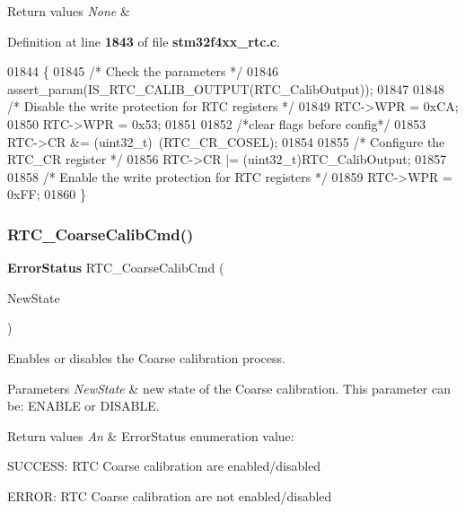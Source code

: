 \begin{DoxyRetVals}{Return values}
{\em None} & \\
\hline
\end{DoxyRetVals}


Definition at line \textbf{ 1843} of file \textbf{ stm32f4xx\+\_\+rtc.\+c}.


\begin{DoxyCode}
01844 \{
01845   \textcolor{comment}{/* Check the parameters */}
01846   assert_param(IS_RTC_CALIB_OUTPUT(RTC\_CalibOutput));
01847 
01848   \textcolor{comment}{/* Disable the write protection for RTC registers */}
01849   RTC->WPR = 0xCA;
01850   RTC->WPR = 0x53;
01851   
01852   \textcolor{comment}{/*clear flags before config*/}
01853   RTC->CR &= (uint32\_t)~(RTC_CR_COSEL);
01854 
01855   \textcolor{comment}{/* Configure the RTC\_CR register */}
01856   RTC->CR |= (uint32\_t)RTC\_CalibOutput;
01857 
01858   \textcolor{comment}{/* Enable the write protection for RTC registers */}
01859   RTC->WPR = 0xFF;
01860 \}
\end{DoxyCode}
\mbox{\label{group__RTC__Group7_ga008ae7173b2befe876f5e76686bc9089}} 
\subsubsection{R\+T\+C\+\_\+\+Coarse\+Calib\+Cmd()}
{\footnotesize\ttfamily \textbf{ Error\+Status} R\+T\+C\+\_\+\+Coarse\+Calib\+Cmd (\begin{DoxyParamCaption}\item[{\textbf{ Functional\+State}}]{New\+State }\end{DoxyParamCaption})}



Enables or disables the Coarse calibration process. 


\begin{DoxyParams}{Parameters}
{\em New\+State} & new state of the Coarse calibration. This parameter can be\+: E\+N\+A\+B\+LE or D\+I\+S\+A\+B\+LE. \\
\hline
\end{DoxyParams}

\begin{DoxyRetVals}{Return values}
{\em An} & Error\+Status enumeration value\+:
\begin{DoxyItemize}
\item S\+U\+C\+C\+E\+SS\+: R\+TC Coarse calibration are enabled/disabled
\item E\+R\+R\+OR\+: R\+TC Coarse calibration are not enabled/disabled 
\end{DoxyItemize}\\
\hline
\end{DoxyRetVals}


